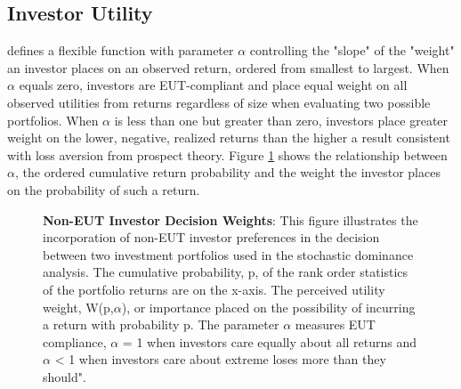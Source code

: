 \subsection{Investor Utility}

\citet{prelec_probability_1998} defines a flexible function with parameter $\alpha$ controlling the "slope" of the "weight" an investor places on an observed return, ordered from smallest to largest. When $\alpha$ equals zero, investors are EUT-compliant and place equal weight on all observed utilities from returns regardless of size when evaluating two possible portfolios. When $\alpha$ is less than one but greater than zero, investors place greater weight on the lower, negative, realized returns than the higher a result consistent with loss aversion from prospect theory. Figure \ref{fig:sd_ill_graph} shows the relationship between $\alpha$, the ordered cumulative return probability and the weight the investor places on the probability of such a return.\\
\begin{figure}[htb]
	\centering
	\caption{{\bf Non-EUT Investor Decision Weights}: This figure illustrates the incorporation of non-EUT investor preferences in the decision between two investment portfolios used in the stochastic dominance analysis. The cumulative probability, p, of the rank order statistics of the portfolio returns are on the x-axis. The perceived utility weight, W(p,$\alpha$), or importance placed on the possibility of incurring a return with probability p. The parameter $\alpha$ measures EUT compliance, $\alpha$ = 1 when investors care equally about all returns and $\alpha$ < 1 when investors care about extreme loses more than they should".} \label{fig:sd_ill_graph}
	
\end{figure}
